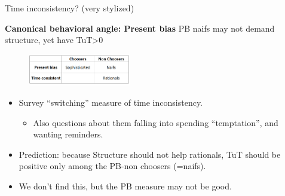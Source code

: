 \documentclass[9pt, aspectratio=169]{beamer}
\begin{document}
\begin{frame}{Time inconsistency? (very stylized)}

 \textbf{Canonical behavioral angle: Present bias}  PB naifs may not demand structure, yet have TuT>0

\begin{figure}[H]
    \begin{center}
        \centering
        \includegraphics[width=0.4\textwidth]{Figuras/hyperbolicity_strata.png}
    \end{center}
\end{figure}   
    \pause \begin{itemize}
    \item Survey ``switching'' measure of time inconsistency. %
    \begin{itemize}
        \item Also questions about them falling into spending ``temptation'', and wanting reminders.
    \end{itemize}
     
    \vfill \item  Prediction: because Structure should not help rationals, TuT should be positive only among the PB-non choosers (=naifs).   
    \item We don't find this,  but the PB measure may not be good.
    
    \end{itemize}
\end{frame}



    
\end{document}
